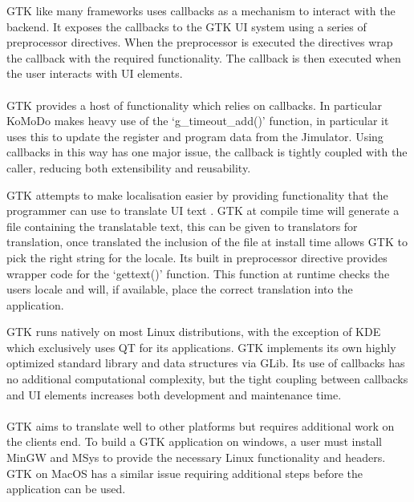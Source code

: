  GTK like many frameworks uses callbacks as a mechanism to interact with the backend. It exposes the callbacks to the GTK UI system using a series of preprocessor directives. When the preprocessor is executed the directives wrap the callback with the required functionality. The callback is then executed when the user interacts with UI elements.\\\\
  GTK provides a host of functionality which relies on callbacks. In particular KoMoDo makes heavy use of the `g\_timeout\_add()' function, in particular it uses this to update the register and program data from the Jimulator. Using callbacks in this way has one major issue, the callback is tightly coupled with the caller, reducing both extensibility and reusability.

  GTK attempts to make localisation easier by providing functionality that the programmer can use to translate UI text \cite{gtk_localisation}. GTK at compile time will generate a file containing the translatable text, this can be given to translators for translation, once translated the inclusion of the file at install time allows GTK to pick the right string for the locale. Its built in preprocessor directive provides wrapper code for the `gettext()' function. This function at runtime checks the users locale and will, if available, place the correct translation into the application.

  GTK runs natively on most Linux distributions, with the exception of KDE which exclusively uses QT for its applications. GTK implements its own highly optimized standard library and data structures via GLib\cite{glib}. Its use of callbacks has no additional computational complexity, but the tight coupling between callbacks and UI elements increases both development and maintenance time.\\\\
  GTK aims to translate well to other platforms but requires additional work on the clients end. To build a GTK application on windows, a user must install MinGW and MSys to provide the necessary Linux functionality and headers. GTK on MacOS has a similar issue requiring additional steps before the application can be used.

